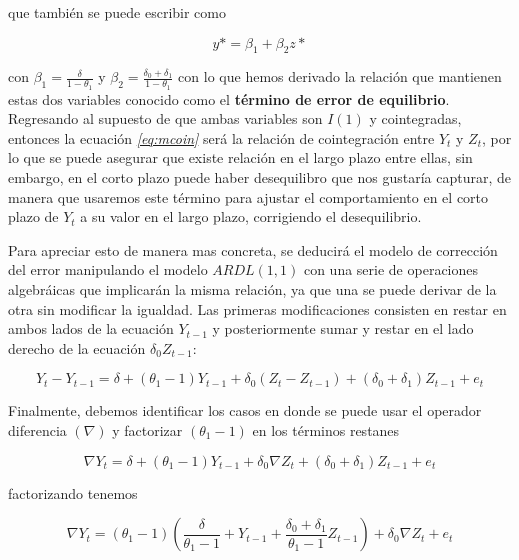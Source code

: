que también se puede escribir como

\begin{equation}
y*= \beta_1 + \beta_2 z* \label{eq:mcoin}
\end{equation}

con $\beta_1=\frac{\delta}{1-\theta_1}$ y $\beta_2=\frac{\delta_0 + \delta_1}{1-\theta_1}$ con lo que hemos derivado la relación que mantienen estas dos variables conocido como el \textbf{término de error de equilibrio}. Regresando al supuesto de que ambas variables son $I(1)$ y cointegradas, entonces la ecuación  \textit{\ref{eq:mcoin}} será la relación de cointegración entre $Y_t$ y $Z_t$, por lo que se puede asegurar que existe relación en el largo plazo entre ellas, sin embargo, en el corto plazo puede haber desequilibro que nos gustaría capturar, de manera que usaremos este término para ajustar el comportamiento en el corto plazo de $Y_t$ a su valor en el largo plazo, corrigiendo el desequilibrio. \bigskip

Para apreciar esto de manera mas concreta, se deducirá el modelo de corrección del error manipulando el modelo $ARDL(1,1)$ con una serie de operaciones algebráicas que implicarán la misma relación, ya que una se puede derivar de la otra sin modificar la igualdad. Las primeras modificaciones consisten en restar en ambos lados de la ecuación $Y_{t-1}$ y posteriormente sumar y restar en el lado derecho de la ecuación $\delta_0 Z_{t-1}$:

\begin{equation}
Y_t - Y_{t-1}=\delta + (\theta_1 -1) Y_{t-1} + \delta_0( Z_t- Z_{t-1}) + (\delta_0 + \delta_1) Z_{t-1}  + e_t 
\end{equation}
 
 Finalmente, debemos identificar los casos en donde se puede usar el operador diferencia $(\nabla)$ y factorizar $(\theta_1 -1)$ en los términos restanes
 
 \begin{equation}
\nabla Y_t =\delta + (\theta_1 -1) Y_{t-1} + \delta_0 \nabla Z_t + (\delta_0 + \delta_1) Z_{t-1}  + e_t 
\end{equation}

factorizando tenemos 

 \begin{equation}
\nabla Y_t = (\theta_1 -1)\left ( \frac{\delta}{\theta_1 -1} +  Y_{t-1} +  \frac{\delta_0 + \delta_1}{\theta_1 -1} Z_{t-1} \right ) + \delta_0 \nabla Z_t  + e_t 
\end{equation}
 
